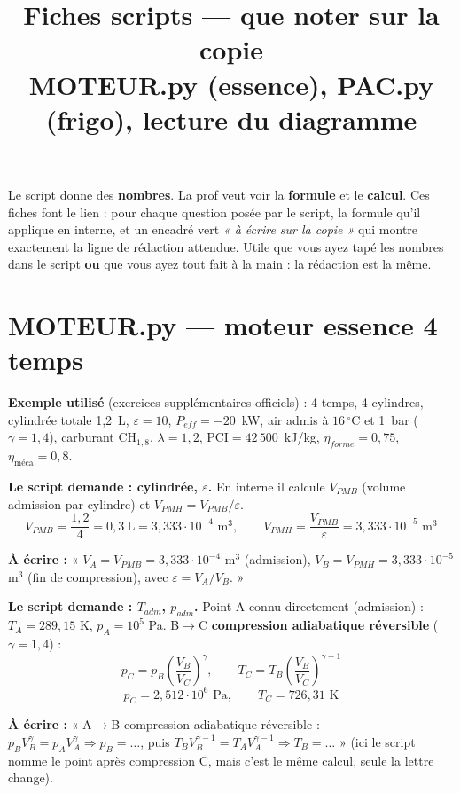 \documentclass[11pt,a4paper]{article}
\title{\textbf{Fiches scripts --- que noter sur la copie}\\[3pt]
\large MOTEUR.py (essence), PAC.py (frigo), lecture du diagramme}
\author{}
\date{}
\begin{document}
\maketitle
\vspace{-0.9cm}

\begin{info}
Le script donne des \textbf{nombres}. La prof veut voir la \textbf{formule} et le \textbf{calcul}. Ces
fiches font le lien : pour chaque question posée par le script, la formule qu'il applique en interne,
et un encadré vert \textit{« à écrire sur la copie »} qui montre exactement la ligne de rédaction
attendue. Utile que vous ayez tapé les nombres dans le script \textbf{ou} que vous ayez tout fait à la
main : la rédaction est la même.
\end{info}

\tableofcontents
\newpage

\section{MOTEUR.py --- moteur essence 4 temps}

\begin{enonce}
\textbf{Exemple utilisé} (exercices supplémentaires officiels) : 4 temps, 4 cylindres, cylindrée
totale 1,2~L, $\varepsilon=10$, $P_{eff}=-20$~kW, air admis à $16\,^\circ$C et 1~bar
($\gamma=1{,}4$), carburant CH$_{1,8}$, $\lambda=1{,}2$, PCI$=42\,500$~kJ/kg,
$\eta_{forme}=0{,}75$, $\eta_{\text{méca}}=0{,}8$.
\end{enonce}

\begin{step}
\textbf{Le script demande : cylindrée, $\varepsilon$.} En interne il calcule $V_{PMB}$ (volume
admission par cylindre) et $V_{PMH}=V_{PMB}/\varepsilon$.
\[ V_{PMB}=\frac{1{,}2}{4}=0{,}3~\text{L} = 3{,}333\cdot10^{-4}\text{ m}^3,\qquad
V_{PMH}=\frac{V_{PMB}}{\varepsilon}=3{,}333\cdot10^{-5}\text{ m}^3 \]
\end{step}
\begin{ecrire}
\textbf{À écrire :} « $V_A=V_{PMB}=3{,}333\cdot10^{-4}$ m$^3$ (admission), $V_B=V_{PMH}=3{,}333\cdot10^{-5}$
m$^3$ (fin de compression), avec $\varepsilon=V_A/V_B$. »
\end{ecrire}

\begin{step}
\textbf{Le script demande : $T_{adm}$, $p_{adm}$.} Point A connu directement (admission) :
$T_A=289{,}15$ K, $p_A=10^5$ Pa. B$\to$C \textbf{compression adiabatique réversible}
($\gamma=1{,}4$) :
\[ p_C=p_B\left(\frac{V_B}{V_C}\right)^\gamma,\qquad T_C=T_B\left(\frac{V_B}{V_C}\right)^{\gamma-1} \]
\[ p_C = 2{,}512\cdot10^6\text{ Pa},\qquad T_C = 726{,}31\text{ K} \]
\end{step}
\begin{ecrire}
\textbf{À écrire :} « A$\to$B compression adiabatique réversible : $p_BV_B^\gamma=p_AV_A^\gamma
\Rightarrow p_B=\ldots$, puis $T_BV_B^{\gamma-1}=T_AV_A^{\gamma-1}\Rightarrow T_B=\ldots$ »
(ici le script nomme le point après compression C, mais c'est le même calcul, seule la lettre change).
\end{ecrire}
\end{document}

